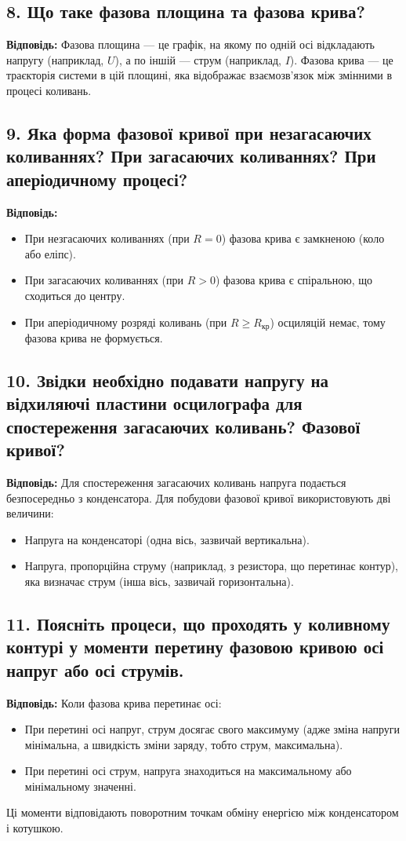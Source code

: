 \documentclass[12pt,a4paper]{article}
\begin{document}
    \subsection*{8. Що таке фазова площина та фазова крива?}
    \textbf{Відповідь:}  
    Фазова площина --- це графік, на якому по одній осі відкладають напругу (наприклад, \(U\)), а по іншій --- струм (наприклад, \(I\)).  
    Фазова крива --- це траєкторія системи в цій площині, яка відображає взаємозв’язок між змінними в процесі коливань.

    \subsection*{9. Яка форма фазової кривої при незагасаючих коливаннях? При загасаючих коливаннях? При аперіодичному процесі?}
    \textbf{Відповідь:}  
    \begin{itemize}
        \item При незгасаючих коливаннях (при \(R=0\)) фазова крива є замкненою (коло або еліпс).
        \item При загасаючих коливаннях (при \(R>0\)) фазова крива є спіральною, що сходиться до центру.
        \item При аперіодичному розряді коливань (при \(R \ge R_{\text{кр}}\)) осциляцій немає, тому фазова крива не формується.
    \end{itemize}

    \subsection*{10. Звідки необхідно подавати напругу на відхиляючі пластини осцилографа для спостереження загасаючих коливань? Фазової кривої?}
    \textbf{Відповідь:}  
    Для спостереження загасаючих коливань напруга подається безпосередньо з конденсатора.  
    Для побудови фазової кривої використовують дві величини:  
    \begin{itemize}
        \item Напруга на конденсаторі (одна вісь, зазвичай вертикальна).
        \item Напруга, пропорційна струму (наприклад, з резистора, що перетинає контур), яка визначає струм (інша вісь, зазвичай горизонтальна).
    \end{itemize}

    \subsection*{11. Поясніть процеси, що проходять у коливному контурі у моменти перетину фазовою кривою осі напруг або осі струмів.}
    \textbf{Відповідь:}  
    Коли фазова крива перетинає осі:
    \begin{itemize}
        \item При перетині осі напруг, струм досягає свого максимуму (адже зміна напруги мінімальна, а швидкість зміни заряду, тобто струм, максимальна).
        \item При перетині осі струм, напруга знаходиться на максимальному або мінімальному значенні.
    \end{itemize}
    Ці моменти відповідають поворотним точкам обміну енергією між конденсатором і котушкою.
\end{document}
